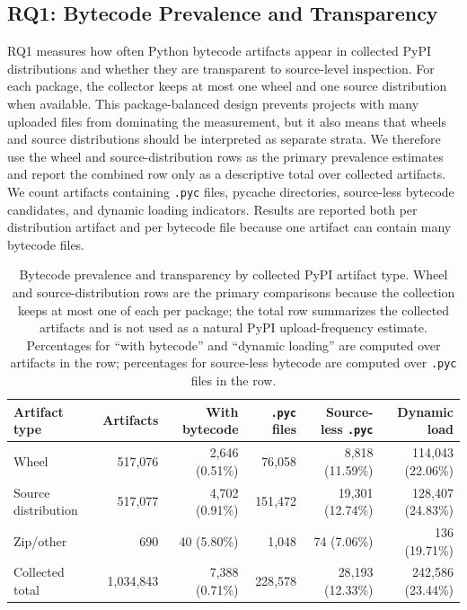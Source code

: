 
\subsection{RQ1: Bytecode Prevalence and Transparency}\label{sec:effmeasure}

RQ1 measures how often Python bytecode artifacts appear in collected PyPI distributions and whether they are transparent to source-level inspection.  For each package, the collector keeps at most one wheel and one source distribution when available.  This package-balanced design prevents projects with many uploaded files from dominating the measurement, but it also means that wheels and source distributions should be interpreted as separate strata.  We therefore use the wheel and source-distribution rows as the primary prevalence estimates and report the combined row only as a descriptive total over collected artifacts.  We count artifacts containing \texttt{.pyc} files, pycache directories, source-less bytecode candidates, and dynamic loading indicators.  Results are reported both per distribution artifact and per bytecode file because one artifact can contain many bytecode files.

\begin{table}[t]
  \centering
  \caption{Bytecode prevalence and transparency by collected PyPI artifact type. Wheel and source-distribution rows are the primary comparisons because the collection keeps at most one of each per package; the total row summarizes the collected artifacts and is not used as a natural PyPI upload-frequency estimate. Percentages for ``with bytecode'' and ``dynamic loading'' are computed over artifacts in the row; percentages for source-less bytecode are computed over \texttt{.pyc} files in the row.}
  \label{tab:prevalence}
  \begin{tabular}{lrrrrr}
    \toprule
    Artifact type & Artifacts & With bytecode & \texttt{.pyc} files & Source-less \texttt{.pyc} & Dynamic load \\
    \midrule
    Wheel & 517{,}076 & 2{,}646 (0.51\%) & 76{,}058 & 8{,}818 (11.59\%) & 114{,}043 (22.06\%) \\
    Source distribution & 517{,}077 & 4{,}702 (0.91\%) & 151{,}472 & 19{,}301 (12.74\%) & 128{,}407 (24.83\%) \\
    Zip/other & 690 & 40 (5.80\%) & 1{,}048 & 74 (7.06\%) & 136 (19.71\%) \\
    \midrule
    Collected total & 1{,}034{,}843 & 7{,}388 (0.71\%) & 228{,}578 & 28{,}193 (12.33\%) & 242{,}586 (23.44\%) \\
    \bottomrule
  \end{tabular}
\end{table}

